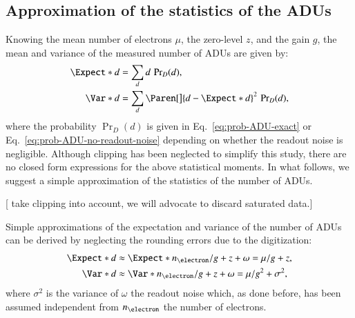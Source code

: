 \documentclass{aa}
\newcommand{\oops}[1]{\textcolor[named]{OrangeRed1}{#1}}
\begin{document}
\subsection{Approximation of the statistics of the ADUs}

Knowing the mean number of electrons $\mu$, the zero-level $z$, and the gain
$g$, the mean and variance of the measured number of ADUs are given by:
\begin{align}
  \Expect*{d}
  &= \sum_d d\,\Pr\nolimits_{D}(d),
  \label{eq:exact-detector-mean}
  \\
  \Var*{d}
  &= \sum_d \Paren[\big]{d - \Expect*{d}}^2\,
  \Pr\nolimits_{D}(d),
  \label{eq:exact-detector-variance}
\end{align}
where the probability $\Pr\nolimits_{D}(d)$ is given in
Eq.~\eqref{eq:prob-ADU-exact} or Eq.~\eqref{eq:prob-ADU-no-readout-noise}
depending
on whether the readout noise is negligible. Although clipping has been
neglected to simplify this study, there are no closed form expressions for the
above statistical moments.  In what follows, we suggest a simple approximation
of the statistics of the number of ADUs.

\oops{[\citep{Foi_et_al-2008-Poissonian_Gaussian_noise_model_fitting} take
  clipping into account, we will advocate to discard saturated data.]}

Simple approximations of the expectation and variance of the number of ADUs can
be derived by neglecting the rounding errors due to the digitization:
\begin{subequations}
\label{eq:detector-statistics-with-no-rounding-errors}
\begin{align}
  \Expect*{d} &\approx
  \Expect*{n_\electron/g + z + \omega}
  = \mu/g + z,
  \label{eq:detector-mean-with-no-rounding-errors}
   \\
  \Var*{d} &\approx
  \Var*{n_\electron/g + z + \omega} = \mu/g^2 + \sigma^2,
  \label{eq:detector-variance-with-no-rounding-errors}
\end{align}
\end{subequations}
where $\sigma^2$ is the variance of $\omega$ the readout noise which, as done
before, has been assumed independent from $n_\electron$ the number of
electrons.
\end{document}
